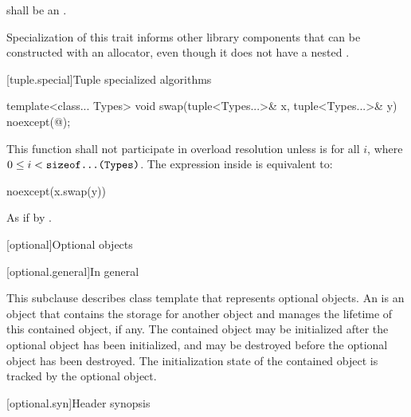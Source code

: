 \begin{itemdescr}
\pnum
\requires {} shall be an .

\pnum
\begin{note} Specialization of this trait informs other library components that
 can be constructed with an allocator, even though it does not have
a nested . \end{note}
\end{itemdescr}

[tuple.special]{Tuple specialized algorithms}

%
\begin{itemdecl}
template<class... Types>
  void swap(tuple<Types...>& x, tuple<Types...>& y) noexcept(@\seebelow@);
\end{itemdecl}

\begin{itemdescr}
\pnum
\remarks This function shall not participate in overload resolution
unless  is 
for all $i$, where $0 \leq i < \texttt{sizeof...(Types)}$.
The expression inside  is equivalent to:

\begin{codeblock}
noexcept(x.swap(y))
\end{codeblock}

\pnum
\effects As if by .
\end{itemdescr}

[optional]{Optional objects}

[optional.general]{In general}

\pnum
This subclause describes class template  that represents
optional objects.
An  is an
object that contains the storage for another object and manages the lifetime of
this contained object, if any. The contained object may be initialized after
the optional object has been initialized, and may be destroyed before the
optional object has been destroyed. The initialization state of the contained
object is tracked by the optional object.

[optional.syn]{Header  synopsis}


